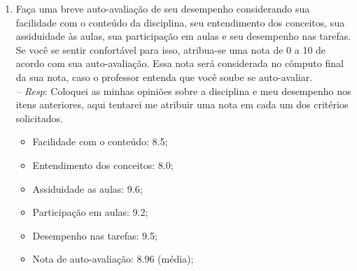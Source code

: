 \documentclass[12pt]{article}
\begin{document}
\begin{enumerate}
\begin{enumerate}
		\item Faça uma breve auto-avaliação de seu desempenho considerando sua 
		         facilidade com o conteúdo da disciplina, seu entendimento dos 
		         conceitos, sua assiduidade às aulas, sua
		         participação em aulas e seu desempenho nas tarefas. Se você se
		         sentir confortável para isso, atribua-se uma nota de 0 a 10
		         de acordo com sua auto-avaliação. Essa nota será considerada
		         no cômputo final da sua nota, caso o professor entenda que
		         você soube se auto-avaliar.\\
		\textit{-- Resp}: Coloquei as minhas opiniões sobre a disciplina e meu desempenho nos itens anteriores, aqui tentarei me atribuir uma nota em cada um dos critérios solicitados.
		\begin{itemize}
			\item Facilidade com o conteúdo: 8.5;	
			\item Entendimento dos conceitos: 8.0;
			\item Assiduidade as aulas: 9.6;
			\item Participação em aulas: 9.2;
			\item Desempenho nas tarefas: 9.5;
			\item Nota de auto-avaliação: 8.96 (média);
		\end{itemize}
	\end{enumerate}

\end{enumerate}
\end{document}
